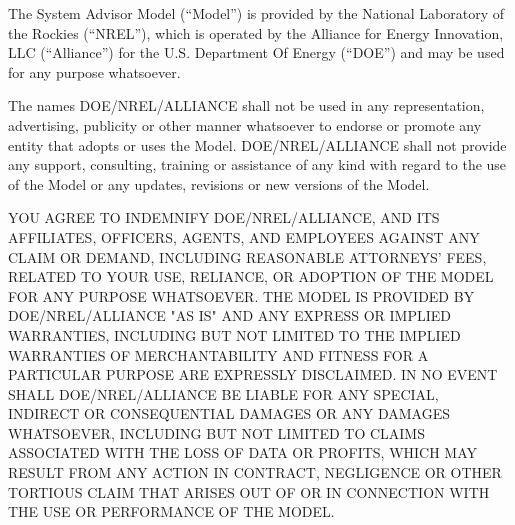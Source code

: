 \documentclass{scrartcl} %
\newcommand{\+}{\discretionary{\mbox{\scriptsize$\hookleftarrow$}}{}{}}
\begin{document}
The System Advisor Model (``Model'') is provided by the National Laboratory of the Rockies (``NREL''), which is operated by the Alliance for Energy Innovation, LLC (``Alliance'') for the U.S. Department Of Energy (``DOE'') and may be used for any purpose whatsoever.

The names DOE/NREL/ALLIANCE shall not be used in any representation, advertising, publicity or other manner whatsoever to endorse or promote any entity that adopts or uses the Model.  DOE/NREL/ALLIANCE shall not provide any support, consulting, training or assistance of any kind with regard to the use of the Model or any updates, revisions or new versions of the Model.

YOU AGREE TO INDEMNIFY DOE/NREL/ALLIANCE, AND ITS AFFILIATES, OFFICERS, AGENTS, AND EMPLOYEES AGAINST ANY CLAIM OR DEMAND, INCLUDING REASONABLE ATTORNEYS' FEES, RELATED TO YOUR USE, RELIANCE, OR ADOPTION OF THE MODEL FOR ANY PURPOSE WHATSOEVER.  THE MODEL IS PROVIDED BY DOE/NREL/ALLIANCE "AS IS" AND ANY EXPRESS OR IMPLIED WARRANTIES, INCLUDING BUT NOT LIMITED TO THE IMPLIED WARRANTIES OF MERCHANTABILITY AND FITNESS FOR A PARTICULAR PURPOSE ARE EXPRESSLY DISCLAIMED.  IN NO EVENT SHALL DOE/NREL/ALLIANCE BE LIABLE FOR ANY SPECIAL, INDIRECT OR CONSEQUENTIAL DAMAGES OR ANY DAMAGES WHATSOEVER, INCLUDING BUT NOT LIMITED TO CLAIMS ASSOCIATED WITH THE LOSS OF DATA OR PROFITS, WHICH MAY RESULT FROM ANY ACTION IN CONTRACT, NEGLIGENCE OR OTHER TORTIOUS CLAIM THAT ARISES OUT OF OR IN CONNECTION WITH THE USE OR PERFORMANCE OF THE MODEL.
\end{document}

